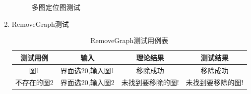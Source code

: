 \documentclass[supercite]{HustGraduPaper}
\theoremstyle{definition}
\begin{document}
\begin{enumerate}
\begin{figure}[htb]
		      \caption{多图定位图测试}
	      \end{figure}
	      \newpage
	\item RemoveGraph测试
	      \begin{table}[htb]
		      \begin{center}
			      \setlength{\tabcolsep}{2.0mm}
			      \caption{RemoveGraph测试用例表}
			      \label{t17}
			      \begin{tabular}{|c|c|c|c|}
				      \hline
				      测试用例    & 输入             & 理论结果          & 测试结果          \\
				      \hline
				      \hline
				      图1         & 界面选20,输入图1 & 移除成功          & 移除成功          \\
				      \hline
				      不存在的图2 & 界面选20,输入图2 & 未找到要移除的图! & 未找到要移除的图! \\
				      \hline
			      \end{tabular}
		      \end{center}
	      \end{table}
	      \begin{figure}[htb]
		      \centering
		      \quad
		      \\

\end{figure}
\end{enumerate}
\end{document}
